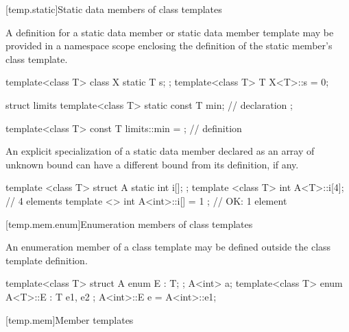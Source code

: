 [temp.static]{Static data members of class templates}

\pnum
{}%
A definition for a static data member or static data member template may be
provided in a namespace scope enclosing the definition of the static member's
class template.
\begin{example}
\begin{codeblock}
template<class T> class X {
  static T s;
};
template<class T> T X<T>::s = 0;

struct limits {
  template<class T>
    static const T min;                 // declaration
};

template<class T>
  const T limits::min = { };            // definition
\end{codeblock}
\end{example}

\pnum
An explicit specialization of a static data member declared as an array of unknown
bound can have a different bound from its definition, if any.
\begin{example}
\begin{codeblock}
template <class T> struct A {
  static int i[];
};
template <class T> int A<T>::i[4];      // 4 elements
template <> int A<int>::i[] = { 1 };    // OK: 1 element
\end{codeblock}
\end{example}

[temp.mem.enum]{Enumeration members of class templates}

\pnum
An enumeration member of a class template may be defined outside the class
template definition.
\begin{example}
\begin{codeblock}
template<class T> struct A {
  enum E : T;
};
A<int> a;
template<class T> enum A<T>::E : T { e1, e2 };
A<int>::E e = A<int>::e1;
\end{codeblock}
\end{example}

[temp.mem]{Member templates}


